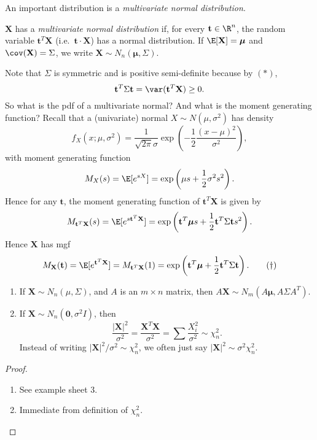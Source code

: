 \documentclass[a4paper]{article}
\begin{document}
An important distribution is a \emph{multivariate normal distribution}.

\begin{defi}
  $\mathbf{X}$ has a \emph{multivariate normal distribution} if, for every $\mathbf{t}\in \R^n$, the random variable $\mathbf{t}^T\mathbf{X}$ (i.e.\ $\mathbf{t}\cdot \mathbf{X}$) has a normal distribution. If $\E[\mathbf{X}] = \boldsymbol\mu$ and $\cov (\mathbf{X}) = \Sigma$, we write $\mathbf{X}\sim N_n(\boldsymbol\mu, \Sigma)$.
\end{defi}

Note that $\Sigma$ is symmetric and is positive semi-definite because by $(*)$,
\[
  \mathbf{t}^T\Sigma \mathbf{t} = \var(\mathbf{t}^T\mathbf{X}) \geq 0.
\]
So what is the pdf of a multivariate normal? And what is the moment generating function? Recall that a (univariate) normal $X\sim N(\mu, \sigma^2)$ has density
\[
  f_X(x; \mu, \sigma^2) = \frac{1}{\sqrt{2\pi}\sigma} \exp\left(-\frac{1}{2}\frac{(x - \mu)^2}{\sigma^2}\right),
\]
with moment generating function
\[
  M_X(s) = \E[e^{sX}] = \exp\left(\mu s + \frac{1}{2}\sigma^2 s^2\right).
\]
Hence for any $\mathbf{t}$, the moment generating function of $\mathbf{t}^T\mathbf{X}$ is given by
\[
  M_{\mathbf{t}^T \mathbf{X}}(s) = \E[e^{s\mathbf{t}^T\mathbf{X}}] = \exp\left(\mathbf{t}^T\boldsymbol\mu s + \frac{1}{2}\mathbf{t}^T\Sigma \mathbf{t}s^2\right).
\]
Hence $\mathbf{X}$ has mgf
\[
  M_\mathbf{X}(\mathbf{t}) = \E[e^{\mathbf{t}^T \mathbf{X}}]= M_{\mathbf{t}^T\mathbf{X}}(1) = \exp\left(\mathbf{t}^T\boldsymbol\mu + \frac{1}{2}\mathbf{t}^T \Sigma \mathbf{t}\right).\tag{$\dagger$}
\]

\begin{prop}\leavevmode
  \begin{enumerate}
    \item If $\mathbf{X} \sim N_n(\mu, \Sigma)$, and $A$ is an $m\times n$ matrix, then $A\mathbf{X} \sim N_m (A\boldsymbol\mu, A\Sigma A^T)$.
    \item If $\mathbf{X}\sim N_n(\mathbf{0}, \sigma^2 I)$, then
      \[
        \frac{|\mathbf{X}|^2}{\sigma^2} = \frac{\mathbf{X}^T\mathbf{X}}{\sigma^2} = \sum \frac{X_i^2}{\sigma ^2}\sim \chi_n^2.
      \]
      Instead of writing $|\mathbf{X}|^2/\sigma^2 \sim \chi_n^2$, we often just say $|\mathbf{X}|^2 \sim \sigma^2 \chi_n^2$.
  \end{enumerate}
\end{prop}

\begin{proof}\leavevmode
  \begin{enumerate}
    \item See example sheet 3.
    \item Immediate from definition of $\chi_n^2$.\qedhere
  \end{enumerate}
\end{proof}
\end{document}
